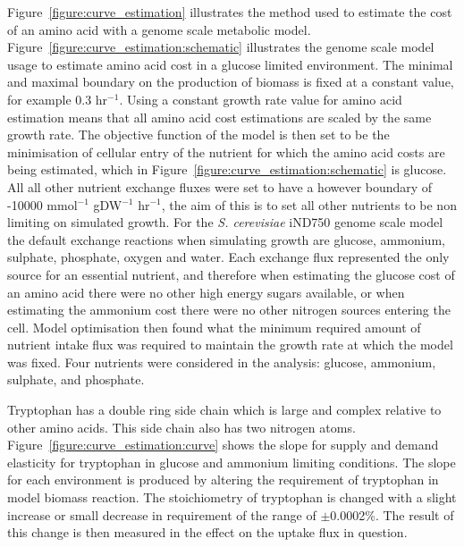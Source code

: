 Figure~\vref{figure:curve_estimation} illustrates the method used to estimate the cost of an amino acid with a genome scale metabolic model. Figure~\ref{figure:curve_estimation:schematic} illustrates the genome scale model usage to estimate amino acid cost in a glucose limited environment. The minimal and maximal boundary on the production of biomass is fixed at a constant value, for example 0.3 hr$^{-1}$. Using a constant growth rate value for amino acid estimation means that all amino acid cost estimations are scaled by the same growth rate. The objective function of the model is then set to be the minimisation of cellular entry of the nutrient for which the amino acid costs are being estimated, which in Figure~\ref{figure:curve_estimation:schematic} is glucose. All all other nutrient exchange fluxes were set to have a however boundary of -10000 mmol$^{-1}$ gDW$^{-1}$ hr$^{-1}$, the aim of this is to set all other nutrients to be non limiting on simulated growth. For the \emph{S. cerevisiae} iND750 \cite{duarte2004a} genome scale model the default exchange reactions when simulating growth are glucose, ammonium, sulphate, phosphate, oxygen and water. Each exchange flux represented the only source for an essential nutrient, and therefore when estimating the glucose cost of an amino acid there were no other high energy sugars available, or when estimating the ammonium cost there were no other nitrogen sources entering the cell. Model optimisation then found what the minimum required amount of nutrient intake flux was required to maintain the growth rate at which the model was fixed. Four nutrients were considered in the analysis: glucose, ammonium, sulphate, and phosphate. 

Tryptophan has a double ring side chain which is large and complex relative to other amino acids. This side chain also has two nitrogen atoms. Figure~\ref{figure:curve_estimation:curve} shows the slope for supply and demand elasticity for tryptophan in glucose and ammonium limiting conditions. The slope for each environment is produced by altering the requirement of tryptophan in model biomass reaction. The stoichiometry of tryptophan is changed with a slight increase or small decrease in requirement of the range of $\pm$0.0002\%. The result of this change is then measured in the effect on the uptake flux in question. 

